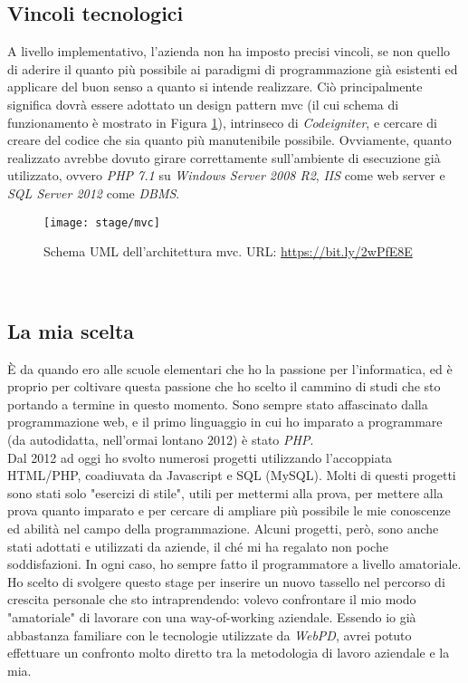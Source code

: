 \subsection{Vincoli tecnologici}
A livello implementativo, l'azienda non ha imposto precisi vincoli, se non quello di aderire il quanto più possibile ai paradigmi di programmazione già esistenti ed applicare del buon senso a quanto si intende realizzare. Ciò principalmente significa dovrà essere adottato un design pattern \gls{mvc} (il cui schema di funzionamento è mostrato in Figura \ref{figura:mvc}), intrinseco di \textit{Codeigniter}, e cercare di creare del codice che 
sia quanto più manutenibile possibile. Ovviamente, quanto realizzato avrebbe dovuto girare correttamente sull'ambiente di esecuzione già utilizzato, ovvero \textit{PHP 7.1} su \textit{Windows Server 2008 R2}, \textit{IIS} come web server e \textit{SQL Server 2012} come \textit{\gls{DBMS}}.
\begin{figure}[!h] 
	\centering 
	\texttt{[image: stage/mvc]} 
	\caption{Schema UML dell'architettura \gls{mvc}. URL: \url{https://bit.ly/2wPfE8E} }
	\label{figura:mvc}
\end{figure}\\

\subsection{La mia scelta}
È da quando ero alle scuole elementari che ho la passione per l'informatica, ed è proprio per coltivare questa passione che ho scelto il cammino di studi che sto portando a termine in questo momento. Sono sempre stato affascinato dalla programmazione web, e il primo linguaggio in cui ho imparato a programmare (da autodidatta, nell'ormai lontano 2012) è stato \textit{PHP}.\\
Dal 2012 ad oggi ho svolto numerosi progetti utilizzando l'accoppiata HTML/PHP, coadiuvata da Javascript e SQL (MySQL). Molti di questi progetti sono stati solo "esercizi di stile", utili per mettermi alla prova, per mettere alla prova quanto imparato e per cercare di ampliare più possibile le mie conoscenze ed abilità nel campo della programmazione. Alcuni progetti, però, sono anche stati adottati e utilizzati da aziende, il ché mi ha regalato non poche soddisfazioni. In ogni caso, ho sempre fatto il programmatore a livello amatoriale.\\
Ho scelto di svolgere questo stage per inserire un nuovo tassello nel percorso di crescita personale che sto intraprendendo: volevo confrontare il mio modo "amatoriale" di lavorare con una way-of-working aziendale. Essendo io già abbastanza familiare con le tecnologie utilizzate da \textit{WebPD}, avrei potuto effettuare un confronto molto diretto tra la metodologia di lavoro aziendale e la mia. 